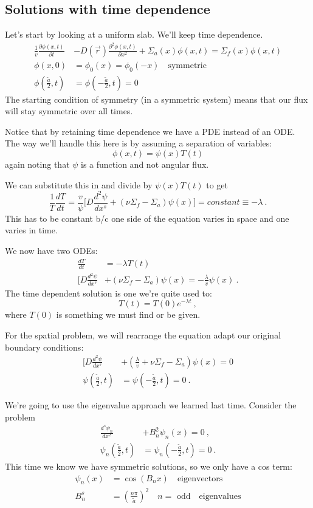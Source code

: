 \documentclass[12pt]{article}
\begin{document}
\subsection*{Solutions with time dependence}
Let's start by looking at a uniform slab. We'll keep time dependence.
\begin{align*}
\frac{1}{v} \frac{\partial \phi(x, t)}{\partial t}& - D(\vec{r}) \frac{\partial ^2 \phi(x, t)}{\partial x^2} + \Sigma_a(x) \phi(x, t) = \Sigma_f (x)\phi(x, t) \\
\phi(x,0) &= \phi_0(x) = \phi_0(-x) \quad \text{symmetric}\\
\phi(\frac{\tilde{a}}{2}, t) &= \phi(-\frac{\tilde{a}}{2}, t) = 0
\end{align*}
The starting condition of symmetry (in a symmetric system) means that our flux will stay symmetric over all times.

Notice that by retaining time dependence we have a PDE instead of an ODE. The way we'll handle this here is by assuming a separation of variables:
\[
\phi(x,t) = \psi(x) T(t)
\]
again noting that $\psi$ is a function and not angular flux.

We can substitute this in and divide by $\psi(x) T(t)$ to get
\[
\frac{1}{T}\frac{dT}{dt} = \frac{v}{\psi}\bigl[ D\frac{d^2 \psi}{dx^s} + (\nu \Sigma_f - \Sigma_a) \psi(x) \bigr] = constant \equiv -\lambda \:.
\]
This has to be constant b/c one side of the equation varies in space and one varies in time. 

We now have two ODEs:
\begin{align*}
\frac{dT}{dt} &= -\lambda T(t) \\
\bigl[ D\frac{d^2 \psi}{dx^s} &+ (\nu \Sigma_f - \Sigma_a) \psi(x) = -\frac{\lambda}{v} \psi(x) \:.
\end{align*}
The time dependent solution is one we're quite used to:
\[
T(t) = T(0) e^{-\lambda t}\:,
\]
where $T(0)$ is something we must find or be given.

For the spatial problem, we will rearrange the equation adapt our original boundary conditions:
\begin{align*}
\bigl[ D\frac{d^2 \psi}{dx^s} &+ (\frac{\lambda}{v} + \nu \Sigma_f - \Sigma_a) \psi(x) = 0 \\
\psi(\frac{\tilde{a}}{2}, t) &= \psi(-\frac{\tilde{a}}{2}, t) = 0\:.
\end{align*}

We're going to use the eigenvalue approach we learned last time. Consider the problem
\begin{align*}
\frac{d^s \psi_n}{dx^2} &+ B_n^2 \psi_n(x) = 0 \:,\\
\psi_n(\frac{\tilde{a}}{2}, t) &= \psi_n(-\frac{\tilde{a}}{2}, t) = 0\:.
\end{align*}
This time we know we have symmetric solutions, so we only have a cos term:
\begin{align*}
\psi_n(x) &= \cos(B_n x) \quad \text{eigenvectors}\\
B_n^s &= (\frac{n\pi}{\tilde{a}})^2 \quad n = \text{ odd} \quad \text{eigenvalues}
\end{align*}
\end{document}
